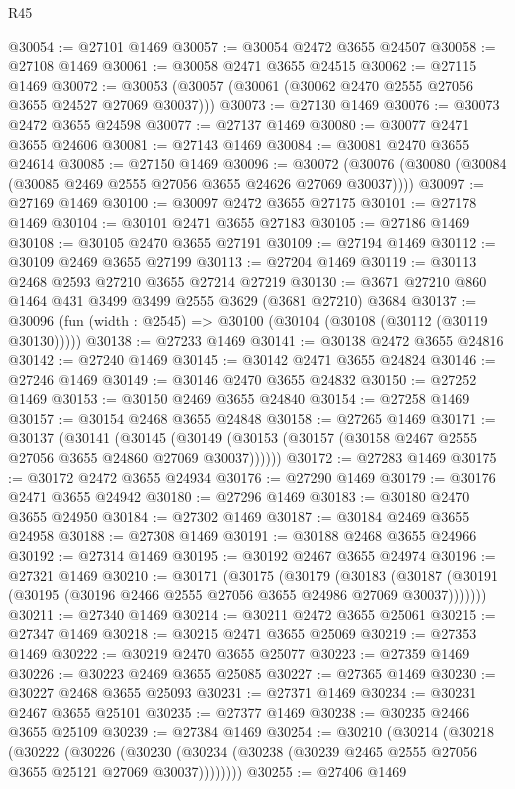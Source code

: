 \begin{lexlean}{R45}
\begin{coremodule}
@30054 := @27101 @1469
@30057 := @30054 @2472 @3655 @24507
@30058 := @27108 @1469
@30061 := @30058 @2471 @3655 @24515
@30062 := @27115 @1469
@30072 := @30053 (@30057 (@30061 (@30062 @2470 @2555 @27056 @3655 @24527 @27069 @30037)))
@30073 := @27130 @1469
@30076 := @30073 @2472 @3655 @24598
@30077 := @27137 @1469
@30080 := @30077 @2471 @3655 @24606
@30081 := @27143 @1469
@30084 := @30081 @2470 @3655 @24614
@30085 := @27150 @1469
@30096 := @30072 (@30076 (@30080 (@30084 (@30085 @2469 @2555 @27056 @3655 @24626 @27069 @30037))))
@30097 := @27169 @1469
@30100 := @30097 @2472 @3655 @27175
@30101 := @27178 @1469
@30104 := @30101 @2471 @3655 @27183
@30105 := @27186 @1469
@30108 := @30105 @2470 @3655 @27191
@30109 := @27194 @1469
@30112 := @30109 @2469 @3655 @27199
@30113 := @27204 @1469
@30119 := @30113 @2468 @2593 @27210 @3655 @27214 @27219
@30130 := @3671 @27210 @860 @1464 @431 @3499 @3499 @2555 @3629 (@3681 @27210) @3684
@30137 := @30096 (fun (width : @2545) => @30100 (@30104 (@30108 (@30112 (@30119 @30130)))))
@30138 := @27233 @1469
@30141 := @30138 @2472 @3655 @24816
@30142 := @27240 @1469
@30145 := @30142 @2471 @3655 @24824
@30146 := @27246 @1469
@30149 := @30146 @2470 @3655 @24832
@30150 := @27252 @1469
@30153 := @30150 @2469 @3655 @24840
@30154 := @27258 @1469
@30157 := @30154 @2468 @3655 @24848
@30158 := @27265 @1469
@30171 := @30137
    (@30141
      (@30145 (@30149 (@30153 (@30157 (@30158 @2467 @2555 @27056 @3655 @24860 @27069 @30037))))))
@30172 := @27283 @1469
@30175 := @30172 @2472 @3655 @24934
@30176 := @27290 @1469
@30179 := @30176 @2471 @3655 @24942
@30180 := @27296 @1469
@30183 := @30180 @2470 @3655 @24950
@30184 := @27302 @1469
@30187 := @30184 @2469 @3655 @24958
@30188 := @27308 @1469
@30191 := @30188 @2468 @3655 @24966
@30192 := @27314 @1469
@30195 := @30192 @2467 @3655 @24974
@30196 := @27321 @1469
@30210 := @30171
    (@30175
      (@30179
        (@30183 (@30187 (@30191 (@30195 (@30196 @2466 @2555 @27056 @3655 @24986 @27069 @30037)))))))
@30211 := @27340 @1469
@30214 := @30211 @2472 @3655 @25061
@30215 := @27347 @1469
@30218 := @30215 @2471 @3655 @25069
@30219 := @27353 @1469
@30222 := @30219 @2470 @3655 @25077
@30223 := @27359 @1469
@30226 := @30223 @2469 @3655 @25085
@30227 := @27365 @1469
@30230 := @30227 @2468 @3655 @25093
@30231 := @27371 @1469
@30234 := @30231 @2467 @3655 @25101
@30235 := @27377 @1469
@30238 := @30235 @2466 @3655 @25109
@30239 := @27384 @1469
@30254 := @30210
    (@30214
      (@30218
        (@30222
          (@30226
            (@30230 (@30234 (@30238 (@30239 @2465 @2555 @27056 @3655 @25121 @27069 @30037))))))))
@30255 := @27406 @1469

\end{coremodule}
\end{lexlean}
